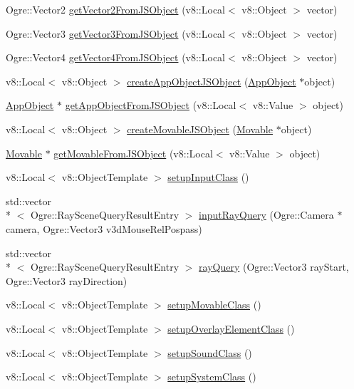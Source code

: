 \begin{DoxyCompactItemize}
Ogre\-::\-Vector2 \hyperlink{namespace_rad_xml_ad90a0e549ffd8dc172a6b4b80affd66d}{get\-Vector2\-From\-J\-S\-Object} (v8\-::\-Local$<$ v8\-::\-Object $>$ vector)
\item 
Ogre\-::\-Vector3 \hyperlink{namespace_rad_xml_a23e9deae315fa6576a394494825be450}{get\-Vector3\-From\-J\-S\-Object} (v8\-::\-Local$<$ v8\-::\-Object $>$ vector)
\item 
Ogre\-::\-Vector4 \hyperlink{namespace_rad_xml_a7b4c5995abd2e2a9882e9475039a6b72}{get\-Vector4\-From\-J\-S\-Object} (v8\-::\-Local$<$ v8\-::\-Object $>$ vector)
\item 
v8\-::\-Local$<$ v8\-::\-Object $>$ \hyperlink{namespace_rad_xml_a2a4a41cb847a58bd6e90e82afe1c26f0}{create\-App\-Object\-J\-S\-Object} (\hyperlink{class_rad_xml_1_1_app_object}{App\-Object} $\ast$object)
\item 
\hyperlink{class_rad_xml_1_1_app_object}{App\-Object} $\ast$ \hyperlink{namespace_rad_xml_a09546130ffc44477d1ad0deef79e61b6}{get\-App\-Object\-From\-J\-S\-Object} (v8\-::\-Local$<$ v8\-::\-Value $>$ object)
\item 
v8\-::\-Local$<$ v8\-::\-Object $>$ \hyperlink{namespace_rad_xml_a8ee64e276f0646a9278c97a4e76036cf}{create\-Movable\-J\-S\-Object} (\hyperlink{class_rad_xml_1_1_movable}{Movable} $\ast$object)
\item 
\hyperlink{class_rad_xml_1_1_movable}{Movable} $\ast$ \hyperlink{namespace_rad_xml_a1ed0e150f9acf92e971c3b8061a58c98}{get\-Movable\-From\-J\-S\-Object} (v8\-::\-Local$<$ v8\-::\-Value $>$ object)
\item 
v8\-::\-Local$<$ v8\-::\-Object\-Template $>$ \hyperlink{namespace_rad_xml_abc886d21dc8d2c6c5eae2aa9e11594fc}{setup\-Input\-Class} ()
\item 
std\-::vector\\*
$<$ Ogre\-::\-Ray\-Scene\-Query\-Result\-Entry $>$ \hyperlink{namespace_rad_xml_af53b301d257882e0097cadb84b37657e}{input\-Ray\-Query} (Ogre\-::\-Camera $\ast$camera, Ogre\-::\-Vector3 v3d\-Mouse\-Rel\-Pospass)
\item 
std\-::vector\\*
$<$ Ogre\-::\-Ray\-Scene\-Query\-Result\-Entry $>$ \hyperlink{namespace_rad_xml_a67d3122837627bb28d8862ca96c76509}{ray\-Query} (Ogre\-::\-Vector3 ray\-Start, Ogre\-::\-Vector3 ray\-Direction)
\item 
v8\-::\-Local$<$ v8\-::\-Object\-Template $>$ \hyperlink{namespace_rad_xml_a0e11102b9924e092d35194ec51d257a7}{setup\-Movable\-Class} ()
\item 
v8\-::\-Local$<$ v8\-::\-Object\-Template $>$ \hyperlink{namespace_rad_xml_a37bda4455d36efe320e06fad59e48153}{setup\-Overlay\-Element\-Class} ()
\item 
v8\-::\-Local$<$ v8\-::\-Object\-Template $>$ \hyperlink{namespace_rad_xml_a4daf5f9992d50935cd8d29841019f717}{setup\-Sound\-Class} ()
\item 
v8\-::\-Local$<$ v8\-::\-Object\-Template $>$ \hyperlink{namespace_rad_xml_a806676f5cd9a5dffad2bf192f1340703}{setup\-System\-Class} ()
\end{DoxyCompactItemize}


